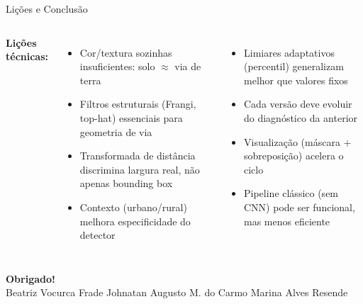 \documentclass[aspectratio=169]{beamer}
\begin{document}
\begin{frame}[t]{Lições e Conclusão}
\scriptsize
\vspace{-1mm}
\begin{columns}
\textbf{Lições técnicas:}
\begin{itemize}
  \item Cor/textura sozinhas insuficientes: solo $\approx$ via de terra
  \item Filtros estruturais (Frangi, top-hat) essenciais para geometria de via
  \item Transformada de distância discrimina largura real, não apenas bounding box
  \item Contexto (urbano/rural) melhora especificidade do detector
\end{itemize}
\begin{itemize}
  \item Limiares adaptativos (percentil) generalizam melhor que valores fixos
  \item Cada versão deve evoluir do diagnóstico da anterior
  \item Visualização (máscara + sobreposição) acelera o ciclo
  \item Pipeline clássico (sem CNN) pode ser funcional, mas menos eficiente
\end{itemize}
\end{columns}

\vfill
\vfill
\vspace{-1mm}\centering
\textbf{Obrigado!}\\[1mm]
\tiny Beatriz Vocurca Frade \quad Johnatan Augusto M. do Carmo \quad Marina Alves Resende
\end{frame}
\end{document}

